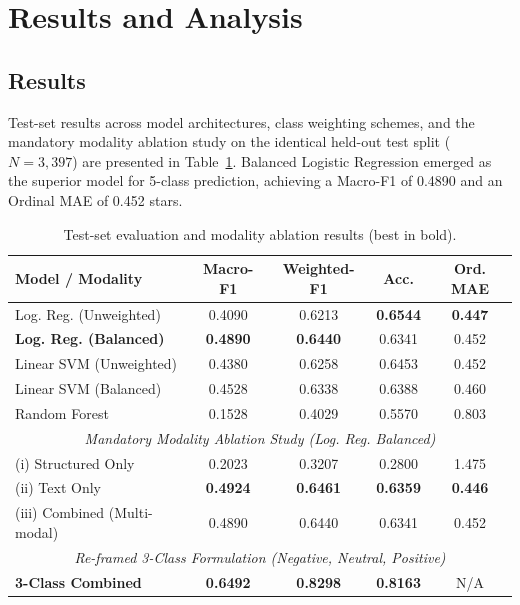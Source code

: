 \documentclass[10pt,conference,a4paper]{IEEEtran}
\begin{document}
\section{Results and Analysis}
\subsection{Results}
Test-set results across model architectures, class weighting schemes, and the mandatory modality ablation study on the identical held-out test split ($N = 3,397$) are presented in Table~\ref{tab:results}. Balanced Logistic Regression emerged as the superior model for 5-class prediction, achieving a Macro-F1 of 0.4890 and an Ordinal MAE of 0.452 stars.

\begin{table}[htbp]
\centering
\caption{Test-set evaluation and modality ablation results (best in bold).}
\label{tab:results}
\begin{tabular}{lcccc}
\toprule
\textbf{Model / Modality} & \textbf{Macro-F1} & \textbf{Weighted-F1} & \textbf{Acc.} & \textbf{Ord. MAE} \\
\midrule
Log. Reg. (Unweighted) & 0.4090 & 0.6213 & \textbf{0.6544} & \textbf{0.447} \\
\textbf{Log. Reg. (Balanced)} & \textbf{0.4890} & \textbf{0.6440} & 0.6341 & 0.452 \\
Linear SVM (Unweighted) & 0.4380 & 0.6258 & 0.6453 & 0.452 \\
Linear SVM (Balanced) & 0.4528 & 0.6338 & 0.6388 & 0.460 \\
Random Forest & 0.1528 & 0.4029 & 0.5570 & 0.803 \\
\midrule
\multicolumn{5}{c}{\textit{Mandatory Modality Ablation Study (Log. Reg. Balanced)}} \\
(i) Structured Only & 0.2023 & 0.3207 & 0.2800 & 1.475 \\
(ii) Text Only & \textbf{0.4924} & \textbf{0.6461} & \textbf{0.6359} & \textbf{0.446} \\
(iii) Combined (Multi-modal) & 0.4890 & 0.6440 & 0.6341 & 0.452 \\
\midrule
\multicolumn{5}{c}{\textit{Re-framed 3-Class Formulation (Negative, Neutral, Positive)}} \\
\textbf{3-Class Combined} & \textbf{0.6492} & \textbf{0.8298} & \textbf{0.8163} & N/A \\
\bottomrule
\end{tabular}
\end{table}
\end{document}
